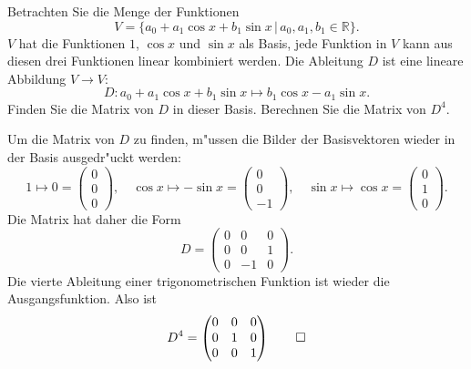 Betrachten Sie die Menge der Funktionen
\[
V=\{
a_0+a_1\cos x+b_1\sin x\,|\,a_0,a_1,b_1\in\mathbb R\}.
\]
$V$ hat die Funktionen $1$, $\cos x$ und $\sin x$ als Basis,
jede Funktion in $V$ kann aus diesen drei Funktionen linear
kombiniert werden.
Die Ableitung $D$ ist eine lineare Abbildung $V\to V$:
\[
D:a_0+a_1\cos x+b_1\sin x\mapsto b_1\cos x -a_1\sin x.
\]
Finden Sie die Matrix von $D$ in dieser Basis. Berechnen Sie
die Matrix von $D^4$.

\begin{loesung}
Um die Matrix von $D$ zu finden, m"ussen die Bilder der
Basisvektoren wieder in der Basis ausgedr"uckt werden:
\[
1\mapsto 0=\begin{pmatrix}0\\0\\0\end{pmatrix},\quad
\cos x\mapsto -\sin x=\begin{pmatrix}0\\0\\-1\end{pmatrix},\quad
\sin x\mapsto \cos x=\begin{pmatrix}0\\1\\0\end{pmatrix}.
\]
Die Matrix hat daher die Form
\[
D=\begin{pmatrix}
0&0&0\\
0&0&1\\
0&-1&0
\end{pmatrix}.
\]
Die vierte Ableitung einer trigonometrischen Funktion ist wieder
die Ausgangsfunktion. Also ist
\[
D^4=\begin{pmatrix}
0&0&0\\
0&1&0\\
0&0&1
\end{pmatrix}
\qedhere
\]
\end{loesung}

